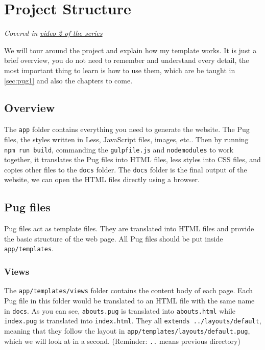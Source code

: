 \chapter{Project Structure}
\label{sec:projstructure}

\textit{Covered in \href{https://www.youtube.com/watch?v=fbbjnhs4nyo&list=PLjGmdnqrOKuYXiu7lgG5HW71jPEUd1XCm&index=3}{video 2 of the series}}
\vspace{6mm}

We will tour around the project and explain how my template works. It is just a brief overview, you do not need to remember and understand every detail, the most important thing to learn is how to use them, which are be taught in \cref{sec:pug1} and also the chapters to come.

\section{Overview}

The \texttt{app} folder contains everything you need to generate the website. The Pug files, the styles written in Less, JavaScript files, images, etc.. Then by running \texttt{npm run build}, commanding the \texttt{gulpfile.js} and \texttt{node\textunderscore modules} to work together, it translates the Pug files into HTML files, less styles into CSS files, and copies other files to the \texttt{docs} folder. The \texttt{docs} folder is the final output of the website, we can open the HTML files directly using a browser.

\section{Pug files}

Pug files act as template files. They are translated into HTML files and provide the basic structure of the web page. All Pug files should be put inside \texttt{app/templates}.

\subsection*{Views}

The \texttt{app/templates/views} folder contains the content body of each page. Each Pug file in this folder would be translated to an HTML file with the same name in \texttt{docs}. As you can see, \texttt{abouts.pug} is translated into \texttt{abouts.html} while \texttt{index.pug} is translated into \texttt{index.html}. They all \texttt{extends ../layouts/default}, meaning that they follow the layout in \texttt{app/templates/layouts/default.pug}, which we will look at in a second. (Reminder: \texttt{..} means previous directory)

